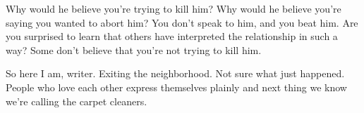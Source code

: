 

Why would he believe you're trying to kill him?  Why would he believe
you're saying you wanted to abort him?  You don't speak to him, and
you beat him.  Are you surprised to learn that others have interpreted
the relationship in such a way?  Some don't believe that you're not
trying to kill him.

So here I am, writer.  Exiting the neighborhood.  Not sure what just
happened.  People who love each other express themselves plainly and
next thing we know we're calling the carpet cleaners.

\bye
